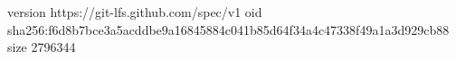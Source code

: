 version https://git-lfs.github.com/spec/v1
oid sha256:f6d8b7bce3a5acddbe9a16845884c041b85d64f34a4c47338f49a1a3d929cb88
size 2796344
